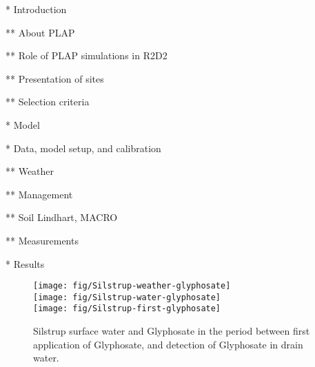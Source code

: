 \documentclass[a4paper]{article}
\begin{document}
\begin{text}
* Introduction

** About PLAP

** Role of PLAP simulations in R2D2

** Presentation of sites

** Selection criteria

* Model

* Data, model setup, and calibration

** Weather

** Management

** Soil Lindhart, MACRO

** Measurements

* Results

\end{text}






\begin{figure}[htbp]
  \begin{center}
    \texttt{[image: fig/Silstrup-weather-glyphosate]}\\
    \texttt{[image: fig/Silstrup-water-glyphosate]}\\
    \texttt{[image: fig/Silstrup-first-glyphosate]}
  \end{center}
  \caption{Silstrup surface water and Glyphosate in the period
    between first application of Glyphosate, and detection of
    Glyphosate in drain water.}
  \label{fig:Silstrup-weather-glyphosate}
\end{figure}
\end{document}
